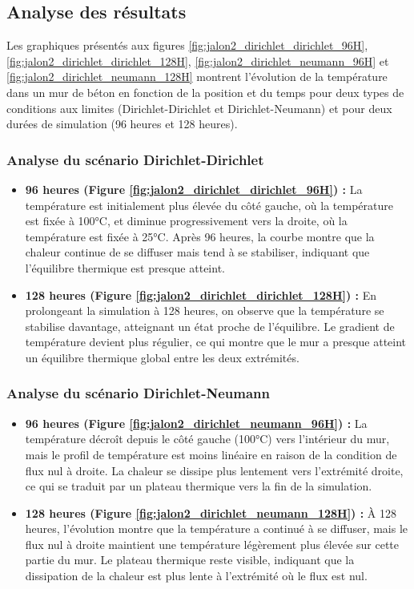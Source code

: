 \documentclass[a4paper,11pt]{article}
\begin{document}
\subsection{Analyse des résultats}
Les graphiques présentés aux figures \ref{fig:jalon2_dirichlet_dirichlet_96H}, \ref{fig:jalon2_dirichlet_dirichlet_128H}, \ref{fig:jalon2_dirichlet_neumann_96H} et \ref{fig:jalon2_dirichlet_neumann_128H} montrent l'évolution de la température dans un mur de béton en fonction de la position et du temps pour deux types de conditions aux limites (Dirichlet-Dirichlet et Dirichlet-Neumann) et pour deux durées de simulation (96 heures et 128 heures).

\subsubsection{Analyse du scénario Dirichlet-Dirichlet}
\begin{itemize}
    \item \textbf{96 heures (Figure \ref{fig:jalon2_dirichlet_dirichlet_96H}) :} La température est initialement plus élevée du côté gauche, où la température est fixée à 100°C, et diminue progressivement vers la droite, où la température est fixée à 25°C. Après 96 heures, la courbe montre que la chaleur continue de se diffuser mais tend à se stabiliser, indiquant que l'équilibre thermique est presque atteint.
    \item \textbf{128 heures (Figure \ref{fig:jalon2_dirichlet_dirichlet_128H}) :} En prolongeant la simulation à 128 heures, on observe que la température se stabilise davantage, atteignant un état proche de l'équilibre. Le gradient de température devient plus régulier, ce qui montre que le mur a presque atteint un équilibre thermique global entre les deux extrémités.
\end{itemize}

\subsubsection{Analyse du scénario Dirichlet-Neumann}
\begin{itemize}
    \item \textbf{96 heures (Figure \ref{fig:jalon2_dirichlet_neumann_96H}) :} La température décroît depuis le côté gauche (100°C) vers l'intérieur du mur, mais le profil de température est moins linéaire en raison de la condition de flux nul à droite. La chaleur se dissipe plus lentement vers l'extrémité droite, ce qui se traduit par un plateau thermique vers la fin de la simulation.
    \item \textbf{128 heures (Figure \ref{fig:jalon2_dirichlet_neumann_128H}) :} À 128 heures, l'évolution montre que la température a continué à se diffuser, mais le flux nul à droite maintient une température légèrement plus élevée sur cette partie du mur. Le plateau thermique reste visible, indiquant que la dissipation de la chaleur est plus lente à l'extrémité où le flux est nul.
\end{itemize}
\end{document}
